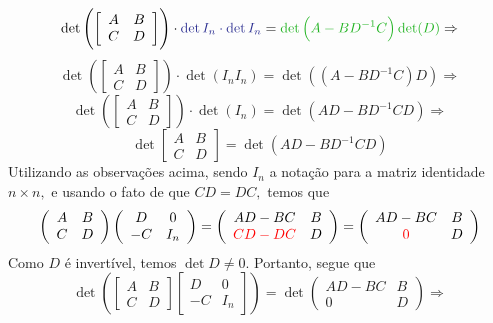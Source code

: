 \documentclass[11pt,a4paper]{article}
\begin{document}
{{\[\]
\[
\det \left( \left[ \begin{array}{cc} A & B \\ C & D \end{array} \right] \right) \cdot \textcolor{Blue}{ \det I_n  \cdot \det I_n} = \textcolor{Verde}{ \det \left(A - BD^{-1}C \right) \det (D)} \Rightarrow
\]
\[
\det \left( \left[ \begin{array}{cc} A & B \\ C & D \end{array} \right] \right) \cdot \det (I_n I_n) =  \det \left((A - BD^{-1}C)D \right) \Rightarrow \]\[\det \left( \left[ \begin{array}{cc} A & B \\ C & D \end{array} \right] \right) \cdot \det (I_n) =  \det (AD - BD^{-1}CD) \Rightarrow 
\]
\[
\boxed{\det \left[ \begin{array}{cc} A & B \\ C & D \end{array} \right] =  \det \left(AD - BD^{-1}CD \right)}
\]
    \task[\pers{b}] Utilizando as observações acima, sendo $I_n$ a notação para a matriz identidade $n \times n,$ e usando o fato de que $CD = DC,$ temos que
    \[
   \left( \begin{array}{cc} A & B \\ C & D \end{array} \right)  \left( \begin{array}{cc} D & 0 \\ -C & I_n \end{array} \right) = \left( \begin{array}{cc} AD - BC & B \\ \textcolor{red}{CD - DC} & D \end{array} \right) = \left( \begin{array}{cc} AD - BC & B \\ \textcolor{red}{0} & D \end{array} \right) 
    \]
    Como $D$ é invertível, temos $\det D \neq 0.$ Portanto, segue que 
    \[
       \det \left(\left[ \begin{array}{cc} A & B \\ C & D \end{array} \right]  \left[ \begin{array}{cc} D & 0 \\ -C & I_n \end{array} \right] \right) = \det \left( \begin{array}{cc} AD - BC & B \\ 0 & D \end{array} \right) \Rightarrow \]
}}
\end{document}
